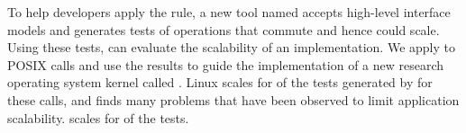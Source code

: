 To help developers apply the rule,
a new tool named \tool
accepts high-level interface models and generates
tests of operations that commute and hence could scale. Using
these tests, \tool can
%
%
evaluate the scalability of an implementation.  We apply \tool to
 POSIX calls and use the results to
guide the implementation of a new research operating system kernel
called \sys.
%
Linux scales for
 of
the  tests generated by \tool for these
calls, and \tool finds many problems that have been observed to limit
application scalability.
%
\sys scales for
 of the
tests.
